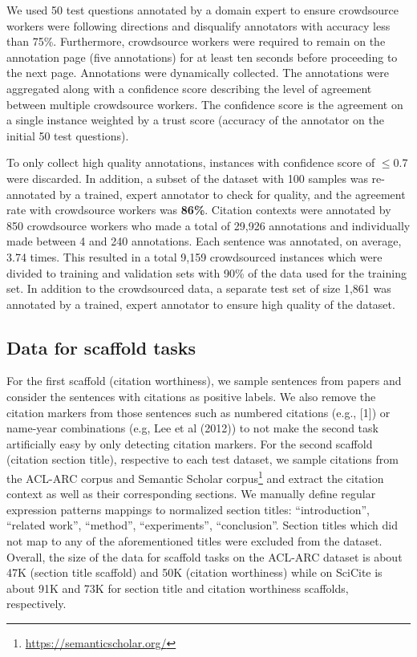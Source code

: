 \documentclass[11pt,a4paper]{article}
\newcommand{\ourdata}{SciCite\xspace}
\begin{document}
We used 50 test questions annotated by a domain expert to ensure crowdsource workers were following directions and disqualify annotators with accuracy less than 75\%. Furthermore, crowdsource workers were required to remain on the annotation page (five annotations) for at least ten seconds before proceeding to the next page. Annotations were dynamically collected. The annotations were aggregated along with a confidence score describing the level of agreement between multiple crowdsource workers. The confidence score is the agreement on a single instance weighted by a trust score (accuracy of the annotator on the initial 50 test questions).




To only collect high quality annotations, instances with confidence score of $\le$0.7 were discarded.
In addition, a subset of the dataset with 100 samples was re-annotated by a trained, expert annotator to check for quality, and the agreement rate with crowdsource workers was \textbf{86\%}. Citation contexts were annotated by 850 crowdsource workers who made a total of 29,926 annotations and individually made between 4 and 240 annotations. Each sentence was annotated, on average, 3.74 times. This resulted in a total 9,159 crowdsourced instances which were divided to training and validation sets with 90\% of the data used for the training set.
In addition to the crowdsourced data, a separate test set of size 1,861 was annotated by a trained, expert annotator to ensure high quality of the dataset.

\subsection{Data for scaffold tasks}

For the first scaffold (citation worthiness), we sample sentences from papers and consider the sentences with citations as positive labels. We also remove the citation markers from those sentences such as numbered citations (e.g., [1]) or name-year combinations (e.g, Lee et al (2012)) to not make the second task artificially easy by only detecting citation markers.
For the second scaffold (citation section title), respective to each test dataset, we sample citations from the ACL-ARC corpus and Semantic Scholar corpus\footnote{\url{https://semanticscholar.org/}} and extract the citation context as well as their corresponding sections. We manually define regular expression patterns mappings to normalized section titles: {``introduction'', ``related work'', ``method'', ``experiments'', ``conclusion''}. Section titles which did not map to any of the aforementioned titles were excluded from the dataset.
Overall, the size of the data for scaffold tasks on the ACL-ARC dataset is about 47K (section title scaffold) and 50K (citation worthiness) while on \ourdata is about 91K and 73K for section title and citation worthiness scaffolds, respectively.
\end{document}
